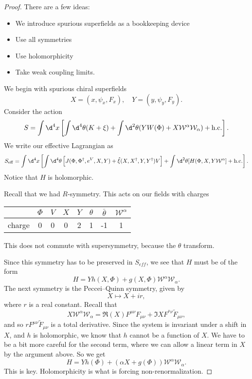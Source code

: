 \documentclass[a4paper]{article}
\begin{document}
\begin{proof}
  There are a few ideas:
  \begin{itemize}
    \item We introduce spurious superfields as a bookkeeping device
    \item Use all symmetries
    \item Use holomorphicity
    \item Take weak coupling limits.
  \end{itemize}
  We begin with spurious chiral superfields
  \[
    X = (x, \psi_x, F_x),\quad Y = (y, \psi_y, F_y).
  \]
  Consider the action
  \[
    S = \int \d^4 x \left[ \int \d^4 \theta (K + \xi) + \int \d^2 \theta (Y W(\Phi) + X \mathcal{W}^\alpha \mathcal{W}_\alpha) + \text{h.c.}\right].
  \]
  We write our effective Lagrangian as
  \[
    S_{\mathrm{eff}} = \int \d^4 x \left[\int \d^4 \theta \left[J(\Phi, \Phi^\dagger, e^V, X, Y) + \hat{\xi}(X, X^\dagger, Y, Y^\dagger) V\right] + \int \d^2 \theta [H(\Phi, X, Y \mathcal{W}^\alpha] + \text{h.c.}\right].
  \]
  Notice that $H$ is holomorphic.

  Recall that we had $R$-symmetry. This acts on our fields with charges
  \begin{center}
    \begin{tabular}{cccccccc}
      \toprule
      & $\Phi$ & $V$ & $X$ & $Y$ & $\theta$ & $\bar{\theta}$ & $\mathcal{W}^\alpha$\\
      \midrule
      charge & 0 & 0 & 0 & 2 & 1 & -1 & 1\\
      \bottomrule
    \end{tabular}
  \end{center}
  This does not commute with supersymmetry, because the $\theta$ transform.

  Since this symmetry has to be preserved in $S_{eff}$, we see that $H$ must be of the form
  \[
    H = Y h(X, \Phi) + g(X, \Phi) \mathcal{W}^\alpha \mathcal{W}_\alpha.
  \]
  The next symmetry is the Peccei--Quinn symmetry, given by
  \[
    X \mapsto X + i r,
  \]
  where $r$ is a real constant. Recall that
  \[
    X \mathcal{W}^\alpha \mathcal{W}_\alpha = \Re(X) F^{\mu\nu} F_{\mu\nu} + \Im X F^{^\mu\nu} \tilde{F}_{\mu\nu},
  \]
  and so $r F^{\mu\nu} \tilde{F}_{\mu\nu}$ is a total derivative. Since the system is invariant under a shift in $X$, and $h$ is holomorphic, we know that $h$ cannot be a function of $X$. We have to be a bit more careful for the second term, where we can allow a linear term in $X$ by the argument above. So we get
  \[
    H = Y h(\Phi) + (\alpha X + g(\Phi)) \mathcal{W}^\alpha \mathcal{W}_\alpha.
  \]
  This is key. Holomorphicity is what is forcing non-renormalization.


\end{proof}
\end{document}
